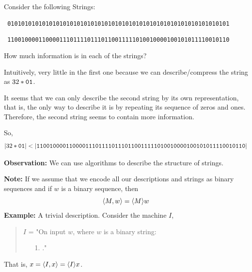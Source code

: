\documentclass[a4paper,blends,pdf,colorBG,slideColor]{prosper}
\begin{document}
Consider the following Strings:
\begin{center}
{\scriptsize\tt
0101010101010101010101010101010101010101010101010101010101010101
}

{\scriptsize\tt
1100100001100001110111101110110011111010010000100101011110010110
}
\end{center}

How much information is in each of the strings?  

Intuitively, very little in the first one
because we can describe/compress the string  as $32*{\tt 01}$.

It seems that we can only describe the second string by its own representation, that is,
the only way to describe it is by  repeating its sequence of zeros and ones.  Therefore,
the second string seems to contain more information.


So,
{\scriptsize
\[
{|{32*{\tt 01}}|} < {|{{\tt 1100100001100001110111101110110011111010010000100101011110010110}}|}
\]
}
\es

{\bf Observation:} We can use algorithms to describe the structure of strings.


{\bf Note:} If we assume that we encode all our descriptions and strings as binary sequences and if $w$ is a binary sequence, then 
\[
\langle {M,w} \rangle = \langle {M} \rangle w
\]
{\bf Example:} A trivial description.  Consider the machine $I$,
\begin{quote}
$I$ = "On input $w$, where $w$ is a binary string:
\begin{itemize}
\item[1.] \accept."
\end{itemize}
\end{quote}
That is, $x = \langle {I,x} \rangle = \langle {I} \rangle x$.
\es
\end{document}
